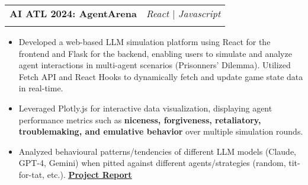 \documentclass[letterpaper,11pt]{article}
\makeatletter
\newcommand{\resumeItem}[1]{
  \item\small{
    {#1 \vspace{-2pt}}
  }
}
\newcommand{\resumeSubheading}[4]{
  \vspace{-2pt}\item
    \begin{tabular*}{0.97\textwidth}[t]{l@{\extracolsep{\fill}}r}
      \textbf{#1} & #2 \\
      \textit{\small#3} & \textit{\small #4} \\
    \end{tabular*}\vspace{-7pt}
}
\newcommand{\resumeItemListStart}{\begin{itemize}}
\newcommand{\resumeItemListEnd}{\end{itemize}\vspace{-8pt}}
\makeatother
\begin{document}
    \resumeSubheading
    {AI ATL 2024: AgentArena}{\textit{React $|$ Javascript}}
    {}{}
    \resumeItemListStart
    \vspace{-5mm}
      \resumeItem{Developed a web-based LLM simulation platform using React for the frontend and Flask for the backend, enabling users to simulate and analyze agent interactions in multi-agent scenarios (Prisonners' Dilemma). Utilized Fetch API and React Hooks to dynamically fetch and update game state data in real-time.}
      \resumeItem{Leveraged Plotly.js for interactive data visualization, displaying agent performance metrics such as \textbf{niceness, forgiveness, retaliatory, troublemaking, and emulative behavior} over multiple simulation rounds.}
      \resumeItem{Analyzed behavioural patterns/tendencies of different LLM models (Claude, GPT-4, Gemini) when pitted against different agents/strategies (random, tit-for-tat, etc.). \href{https://drive.google.com/file/d/1SQzdfGt7ht6lkvVI1J9FIJJ_4yjdPMzK/view?usp=sharing}{\textbf{\underline{Project Report}}}}
    \resumeItemListEnd


  
\end{document}
